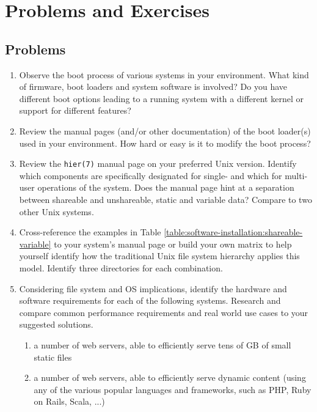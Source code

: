 \vfill
\pagebreak

\chapter*{Problems and Exercises}
\section*{Problems}

\begin{enumerate}
\item
Observe the boot process of various systems in your environment.  What
kind of firmware, boot loaders and system software is involved?  Do you
have different boot options leading to a running system with a different
kernel or support for different features?

\item
Review the manual pages (and/or other documentation) of the boot loader(s)
used in your environment.  How hard or easy is it to modify the boot
process?

\item
Review the {\tt hier(7)} manual page on your preferred Unix version.
Identify which components are specifically designated for single- and
which for multi-user operations of the system.  Does the manual page hint
at a separation between shareable and unshareable, static and variable
data?  Compare to two other Unix systems.

\item
Cross-reference the examples in Table
\ref{table:software-installation:shareable-variable} to your system's
manual page or build your own matrix to help yourself identify how the
traditional Unix file system hierarchy applies this model.  Identify three
directories for each combination.

\item
Considering file system and OS implications, identify the hardware and
software requirements for each of the following systems.  Research and
compare common performance requirements and real world use cases to your
suggested solutions.

\begin{enumerate}
\item
a number of web servers, able to efficiently serve tens of GB of small
static files

\item
a number of web servers, able to efficiently serve dynamic content (using
any of the various popular languages and frameworks, such as PHP, Ruby on
Rails, Scala, ...)


\end{enumerate}
\end{enumerate}

